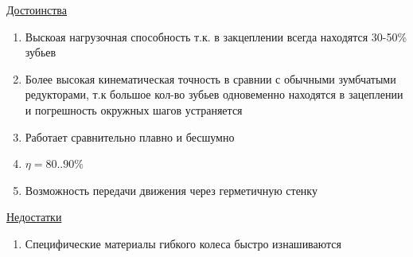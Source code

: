 \documentclass{article}
\begin{document}
\underline{Достоинства} 
\begin{enumerate}
	\item Выскоая нагрузочная способность т.к. в закцеплении всегда находятся 30-50\% зубьев
	\item Более высокая кинематическая точность в сравнии с обычными зумбчатыми редукторами, т.к большое кол-во зубьев одновеменно находятся в зацеплении и погрешность окружных шагов устраняется
	\item Работает сравнительно плавно и бесшумно
	\item $\eta = 80 .. 90 \%$
	\item Возможность передачи движения через герметичную стенку
\end{enumerate}
\underline{Недостатки}
\begin{enumerate}
	\item Специфические материалы гибкого колеса быстро изнашиваются
\end{enumerate}
\end{document}
